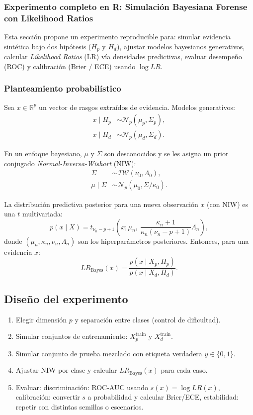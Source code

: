 \documentclass[a4paper,10pt,oneside]{article}
\begin{document}
\subsubsection*{Experimento completo en \textsf{R}: Simulaci\'on Bayesiana Forense con Likelihood Ratios}

Esta secci\'on propone un experimento reproducible para: simular evidencia sint\'etica bajo dos hip\'otesis ($H_p$ y $H_d$), ajustar modelos bayesianos generativos, calcular \textit{Likelihood Ratios} (LR) v\'ia densidades predictivas, evaluar desempe\~no (ROC) y calibraci\'on (Brier / ECE) usando $\log LR$.

\subsubsection*{Planteamiento probabil\'istico}

Sea $x\in\mathbb{R}^p$ un vector de rasgos extra\'idos de evidencia. Modelos generativos:
\begin{align}
x \mid H_p &\sim \mathcal{N}_p(\mu_p,\Sigma_p),\\
x \mid H_d &\sim \mathcal{N}_p(\mu_d,\Sigma_d).
\end{align}

En un enfoque bayesiano, $\mu$ y $\Sigma$ son desconocidos y se les asigna un prior conjugado \textit{Normal-Inversa-Wishart} (NIW):
\begin{align}
\Sigma &\sim \mathcal{IW}(\nu_0,\Lambda_0),\\
\mu\mid\Sigma &\sim \mathcal{N}_p(\mu_0,\Sigma/\kappa_0).
\end{align}

La distribuci\'on predictiva posterior para una nueva observaci\'on $x$ (con NIW) es una $t$ multivariada:
\[
p(x\mid X) = t_{\nu_n-p+1}\left(x; \mu_n,\ \frac{\kappa_n+1}{\kappa_n(\nu_n-p+1)}\Lambda_n\right),
\]
donde $(\mu_n,\kappa_n,\nu_n,\Lambda_n)$ son los hiperpar\'ametros posteriores. Entonces, para una evidencia $x$:
\begin{equation}
LR_{\text{Bayes}}(x) = \frac{p(x\mid X_p,H_p)}{p(x\mid X_d,H_d)}.
\end{equation}

\subsection{Dise\~no del experimento}

\begin{enumerate}
\item Elegir dimensi\'on $p$ y separaci\'on entre clases (control de dificultad).
\item Simular conjuntos de entrenamiento: $X_p^{\text{train}}$ y $X_d^{\text{train}}$.
\item Simular conjunto de prueba mezclado con etiqueta verdadera $y\in\{0,1\}$.
\item Ajustar NIW por clase y calcular $LR_{\text{Bayes}}(x)$ para cada caso.
\item Evaluar: discriminaci\'on: ROC-AUC usando $s(x)=\log LR(x)$, calibraci\'on: convertir $s$ a probabilidad y calcular Brier/ECE, estabilidad: repetir con distintas semillas o escenarios.
\end{enumerate}
\end{document}
